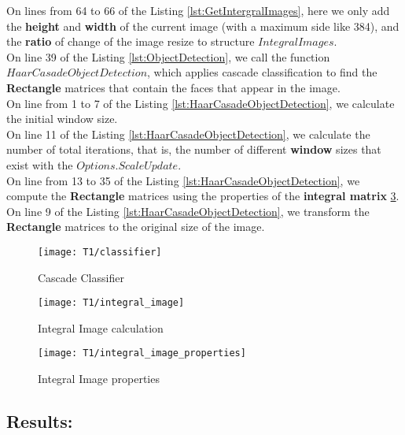 \noindent On lines from 64 to 66 of the Listing \ref{lst:GetIntergralImages}, here we only add the \textbf{height} and \textbf{width} of the current image (with a maximum side like 384), and the \textbf{ratio} of change of the image resize to structure $IntegralImages$.\\ %

\noindent On line 39 of the Listing \ref{lst:ObjectDetection}, we call the function $HaarCasadeObjectDetection$, which applies cascade classification to find the \textbf{Rectangle} matrices that contain the faces that appear in the image.\\

\noindent On line from 1 to 7 of the Listing \ref{lst:HaarCasadeObjectDetection}, we calculate the initial window size.\\

\noindent On line 11 of the Listing \ref{lst:HaarCasadeObjectDetection}, we calculate the number of total iterations, that is, the number of different \textbf{window} sizes that exist with the $Options.ScaleUpdate$.\\

\noindent On line from 13 to 35 of the Listing \ref{lst:HaarCasadeObjectDetection}, we compute the \textbf{Rectangle} matrices using the properties of the \textbf{integral matrix} \ref{fig:integral_properties}.\\

\noindent On line 9 of the Listing \ref{lst:HaarCasadeObjectDetection}, we transform the \textbf{Rectangle} matrices to the original size of the image.

\begin{figure}[h!]
	\centering
	\texttt{[image: T1/classifier]}
	\caption{Cascade Classifier}
	\label{fig:slideT1}
\end{figure}
\begin{figure}[h!]
	\centering
	\texttt{[image: T1/integral\_image]}
	\caption{Integral Image calculation}
	\label{fig:integral}
\end{figure}
\begin{figure}[h!]
	\centering
	\texttt{[image: T1/integral\_image\_properties]}
	\caption{Integral Image properties}
	\label{fig:integral_properties}
\end{figure}

\subsection{Results:}

